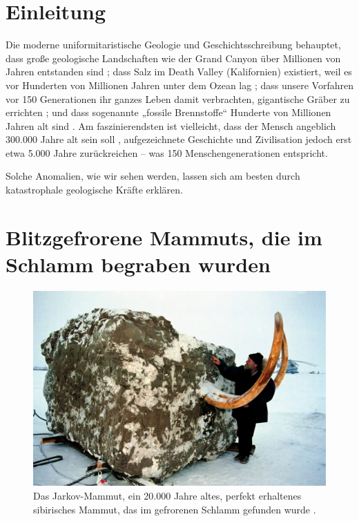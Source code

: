\documentclass[10pt,twocolumn,letterpaper]{article}
\begin{document}

\section{Einleitung}

Die moderne uniformitaristische Geologie und Geschichtsschreibung behauptet, dass große geologische Landschaften wie der Grand Canyon über Millionen von Jahren entstanden sind \cite{143}; dass Salz im Death Valley (Kalifornien) existiert, weil es vor Hunderten von Millionen Jahren unter dem Ozean lag \cite{144}; dass unsere Vorfahren vor 150 Generationen ihr ganzes Leben damit verbrachten, gigantische Gräber zu errichten \cite{29,70}; und dass sogenannte „fossile Brennstoffe“ Hunderte von Millionen Jahren alt sind \cite{104}. Am faszinierendsten ist vielleicht, dass der Mensch angeblich 300.000 Jahre alt sein soll \cite{145}, aufgezeichnete Geschichte und Zivilisation jedoch erst etwa 5.000 Jahre zurückreichen – was 150 Menschengenerationen entspricht.

Solche Anomalien, wie wir sehen werden, lassen sich am besten durch katastrophale geologische Kräfte erklären.

\section{Blitzgefrorene Mammuts, die im Schlamm begraben wurden}

\begin{figure}[t]
\begin{center}
   \includegraphics[width=1\linewidth]{jarkov-mammoth.jpg}
\end{center}
   \caption{Das Jarkov-Mammut, ein 20.000 Jahre altes, perfekt erhaltenes sibirisches Mammut, das im gefrorenen Schlamm gefunden wurde \cite{51}.}
\label{fig:1}
\label{fig:onecol}
\end{figure}
\end{document}
